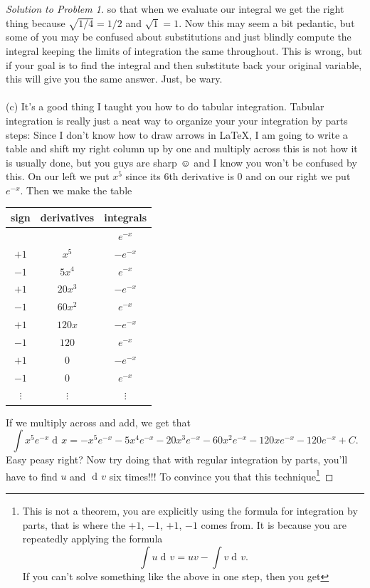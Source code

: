 \documentclass[12pt]{article}
\theoremstyle{plain}
\theoremstyle{definition}
\theoremstyle{remark}
\DeclareMathOperator{\diff}{d\!}
\begin{document}
\begin{proof}[Solution to Problem 1]
so that when we evaluate our integral we get the right thing because
$\sqrt{1/4}=1/2$ and $\sqrt{1}=1$. Now this may seem a bit pedantic, but
some of you may be confused about substitutions and just blindly compute
the integral keeping the limits of integration the same throughout. This is
wrong, but if your goal is to find the integral and then substitute back
your original variable, this will give you the same answer. Just, be wary.
\\\\
(c) It's a good thing I taught you how to do tabular integration. Tabular
integration is really just a neat way to organize your your integration by
parts steps: Since I don't know how to draw arrows in \LaTeX, I am going to
write a table and shift my right column up by one and multiply across this
is not how it is usually done, but you guys are sharp $\smiley$ and I know
you won't be confused by this. On our left we put $x^5$ since its $6$th
derivative is $0$ and on our right we put $e^{-x}$. Then we make the table
\begin{center}
\begin{tabular}{|c|c|c|}
\hline
sign&derivatives&integrals\\
\hline
~&~&$e^{-x}$\\
$+1$&$x^5$&$-e^{-x}$\\
$-1$&$5x^4$&$e^{-x}$\\
$+1$&$20x^3$&$-e^{-x}$\\
$-1$&$60x^2$&$e^{-x}$\\
$+1$&$120x$&$-e^{-x}$\\
$-1$&$120$&$e^{-x}$\\
$+1$&$0$&$-e^{-x}$\\
$-1$&$0$&$e^{-x}$\\
$\vdots$&$\vdots$&$\vdots$\\
\hline
\end{tabular}
\end{center}
If we multiply across and add, we get that
\[
\int x^5e^{-x}\diff x=
\boxed{-x^5e^{-x}-5x^4e^{-x}-20x^3e^{-x}-60x^2e^{-x}-120xe^{-x}-120e^{-x}+C.}
\]
Easy peasy right? Now try doing that with regular integration by parts,
you'll have to find $u$ and $\diff v$ six times!!!
To convince you that this technique\footnote{This is not a
  theorem, you are explicitly using the formula for integration by
  parts, that is where the $+1$, $-1$, $+1$, $-1$ comes from. It is because
you are repeatedly applying the formula
\[
\int u\diff v=uv-\int v\diff v.
\]
If you can't solve something like the above in one step, then you get
}
\end{proof}
\end{document}
